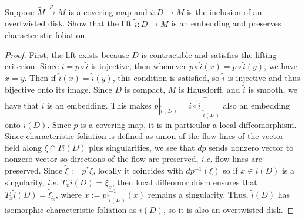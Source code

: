 \documentclass[12pt]{article}
\begin{document}
\begin{problem}[4]
Suppose $ \widetilde{ M} \xrightarrow{ p} M $ is a covering map and $ i: D \to M$ is the inclusion of an overtwisted disk. Show that the lift $ \widetilde{ i} : D \to \widetilde{ M}$ is an embedding and preserves characteristic foliation.

\begin{proof}
First, the lift exists because $ D$ is contractible and satisfies the lifting criterion. Since  $ i = p \circ \widetilde{ i}$ is injective, then whenever $ p \circ \widetilde{ i}(x) = p \circ \widetilde{ i}(y) $, we have $ x=y$. Then if  $ \widetilde{ i}(x) = \widetilde{ i}(y)$, this condition is satisfied, so $ \widetilde{ i}$ is injective and thus bijective onto its image. Since $ D$ is compact,  $ M$ is Hausdorff, and  $ \widetilde{ i}$ is smooth, we have that $ \widetilde{ i}$ is an embedding. This makes $ p|_{ \widetilde{ i}(D)} = i \circ  \widetilde{ i}|_{\widetilde{ i}(D)} ^{-1}$ also an embedding onto $ i(D)$. Since $ p$ is a covering map, it is in particular a local diffeomorphism. Since characteristic foliation is defined as union of the flow lines of the vector field along $ \xi \cap Ti(D)$ plus singularities, we see that $ dp$ sends nonzero vector to nonzero vector so directions of the flow are preserved, \emph{i.e.} flow lines are preserved. Since $ \widetilde{ \xi}:= p^* \xi$, locally it coincides with $dp^{-1}(\xi)$ so if $ x \in i(D)$ is a singularity, \emph{i.e.} $ T _xi(D) = \xi_x  $, then local diffeomorphism ensures that $ T_{\widetilde{ x}} \widetilde{ i}(D) = \widetilde{ \xi}_{\widetilde{ x}}$, where $ \widetilde{ x} := p|_{\widetilde{ i}(D)}^{-1}(x)$ remains a singularity. Thus, $ \widetilde{ i}(D)$ has isomorphic characteristic foliation as $ i(D)$, so it is also an overtwisted disk.


\end{proof}
\end{problem}
\end{document}
